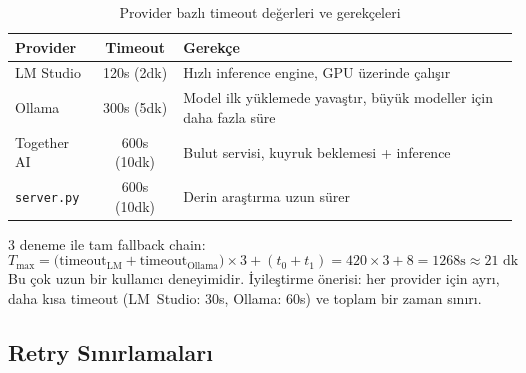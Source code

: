 \begin{table}[H]
\centering
\caption{Provider bazl{\i} timeout de\u{g}erleri ve gerek\c{c}eleri}
\label{tab:timeout}
\begin{tabularx}{\textwidth}{lcX}
\toprule
\color{chapterBlue}\textbf{Provider} &
\color{chapterBlue}\textbf{Timeout} &
\color{chapterBlue}\textbf{Gerek\c{c}e} \\
\midrule
LM Studio & 120s (2dk) & H{\i}zl{\i} inference engine, GPU \"{u}zerinde \c{c}al{\i}\c{s}{\i}r \\
Ollama & 300s (5dk) & Model ilk y\"{u}klemede yava\c{s}t{\i}r, b\"{u}y\"{u}k modeller i\c{c}in daha fazla s\"{u}re \\
Together AI & 600s (10dk) & Bulut servisi, kuyruk beklemesi + inference \\
\texttt{server.py} & 600s (10dk) & Derin ara\c{s}t{\i}rma uzun s\"{u}rer \\
\bottomrule
\end{tabularx}
\end{table}

\begin{formulbox}
3 deneme ile tam fallback chain:
\begin{equation}
T_{\text{max}} = \bigl(\text{timeout}_{\text{LM}} + \text{timeout}_{\text{Ollama}}\bigr) \times 3 + (t_0 + t_1) = 420 \times 3 + 8 = 1268 \text{s} \approx 21 \text{ dk}
\label{eq:timeout-worst}
\end{equation}
Bu \c{c}ok uzun bir kullan{\i}c{\i} deneyimidir. \.{I}yile\c{s}tirme \"{o}nerisi: her provider i\c{c}in ayr{\i}, daha k{\i}sa timeout (LM~Studio: 30s, Ollama: 60s) ve toplam bir zaman s{\i}n{\i}r{\i}.
\end{formulbox}


\subsection{Retry S{\i}n{\i}rlamalar{\i}}
\label{sec:retry-limitations}

